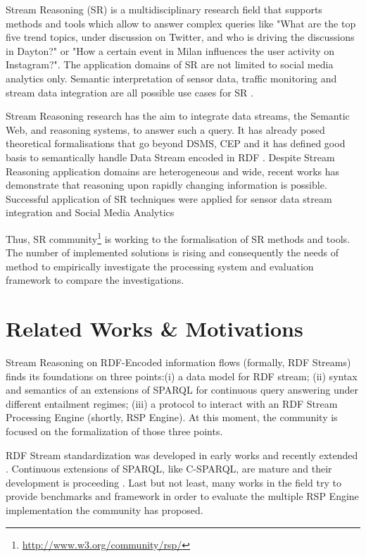 Stream Reasoning (SR) is a multidisciplinary research field that supports methods and tools which allow to answer complex queries like "What are the top five trend topics, under discussion on Twitter, and who is driving the discussions in Dayton?" or "How a certain event in Milan influences the user activity on Instagram?". The application domains of SR are not limited to social media analytics only. Semantic interpretation of sensor data, traffic monitoring and stream data integration are all possible use cases for SR \cite{DBLP:journals/expert/ValleCHF09}.

Stream Reasoning research has the aim to integrate data streams, the Semantic Web, and reasoning systems, to answer such a query. It has already posed theoretical formalisations that go beyond DSMS, CEP  \cite{DBLP:conf/debs/KomazecCF12, Lephuoc2011, 4618773} and it has defined good basis to semantically handle Data Stream encoded in RDF \cite{DBLP:conf/fis/ValleCBBC08, DBLP:journals/sigmod/BarbieriBCVG10}. Despite Stream Reasoning application domains are heterogeneous and wide, recent works has demonstrate that reasoning upon rapidly changing information is possible. Successful application of SR techniques were applied for sensor data stream integration \cite{DBLP:journals/ijswis/CalbimonteJCA12,DBLP:journals/ws/LecueTHTBST14}  and Social Media Analytics \cite{DBLP:journals/ws/BalduiniCDVHLKT12}

Thus, SR community\footnote{\url{http://www.w3.org/community/rsp/}} is working to the formalisation of SR methods and tools. The number of implemented solutions is rising and consequently the needs of method to empirically investigate the processing system and evaluation framework to compare the investigations.


\section{Related Works \& Motivations}\label{sec:motivations-intro}

Stream Reasoning on RDF-Encoded information flows (formally, RDF Streams) finds its foundations on three points:(i) a data model for RDF stream; (ii) syntax and semantics of an extensions of SPARQL for continuous query answering under different entailment regimes; (iii) a protocol to interact with an RDF Stream Processing Engine (shortly, RSP Engine). At this moment, the community is focused on the formalization of those three points. 

RDF Stream standardization was developed in early works \cite{DBLP:journals/expert/ValleCHF09, Lephuoc2011} and recently extended \cite{DBLP:conf/semweb/BalduiniVDTPC13}. Continuous extensions of SPARQL, like C-SPARQL, are mature and their development is proceeding \cite{Barbieri2010}. Last but not least, many works in the field  \cite{Zhang2012,LePhuoc2012c}  try to provide benchmarks and framework in order to evaluate the multiple RSP Engine implementation the community has proposed. 

